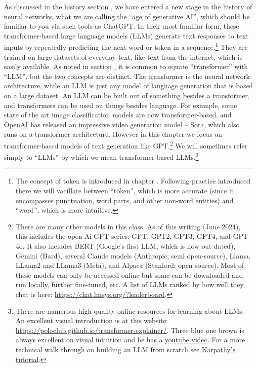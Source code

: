As discussed in the history section , we have entered a new stage in the history of neural networks, what we are calling the ``age of generative AI'', which should be familiar to you via such tools as ChatGPT. In their most familiar form, these transformer-based large language models (LLMs) generate text responses to text inputs by repeatedly predicting the next word or token in a sequence.\footnote{The concept of token is introduced in chapter . Following practice introduced there we will vacillate between ``token'', which is more accurate (since it encompasses punctuation, word parts, and other non-word entities) and ``word'', which is more intuitive.} They are trained on large datasets of everyday text, like text from the internet, which is easily available. As noted in section , it is common to equate ``transformer'' with ``LLM'', but the two concepts are distinct. The transformer is the neural network architecture, while an LLM is just any model of language generation that is based on a large dataset. An LLM can be built out of something besides a transformer, and transformers can be used on things besides language. For example, some state of the art image classification models are now transformer-based, and OpenAI has released an impressive video generation model – Sora, which also runs on a transformer architecture. However in this chapter we focus on transformer-based models of text generation like GPT.\footnote{There are many other models in this class. As of this writing (June 2024), this includes the open Ai GPT series: GPT, GPT2, GPT3, GPT4, and GPT 4o. It also includes BERT (Google’s first LLM, which is now out-dated), Gemini (Bard), several Claude models (Anthropic;  semi open-source), Llama, LLama2 and LLama3 (Meta), and Alpaca (Stanford; open source). Most of these models can only be accessed online but some can be downloaded and run locally, further fine-tuned, etc. A list of LLMs ranked by how well they chat is here: \url{https://chat.lmsys.org/?leaderboard}.} We will sometimes refer simply to ``LLMs'' by which we mean transformer-based LLMs.\footnote{There are numerous high quality online resources for learning about LLMs. An excellent visual introduction is at this website: \url{https://poloclub.github.io/transformer-explainer/}. Three blue one brown is always excellent on visual intuition and he has a \href{https://www.youtube.com/watch?v=wjZofJX0v4M&list=PLZHQObOWTQDNU6R1_67000Dx_ZCJB-3pi}{\underline{youtube video}}. For a more technical walk through on building an LLM from scratch see \href{https://www.youtube.com/watch?v=kCc8FmEb1nY}{\underline{Karpathy's tutorial}}.}

